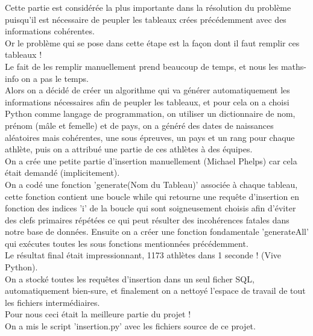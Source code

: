 \documentclass[]{scrreprt}
\begin{document}
		{\large 
			Cette partie est considérée la plus importante dans la résolution du problème puisqu'il est nécessaire de peupler les tableaux crées précédemment avec des informations cohérentes.\\
			Or le problème qui se pose dans cette étape est la façon dont il faut remplir ces tableaux !\\
			Le fait de les remplir manuellement prend beaucoup de temps, et nous les maths-info on a pas le temps.\\
			Alors on a décidé de créer un algorithme qui va générer automatiquement les informations nécessaires afin de peupler les tableaux, et pour cela on a choisi Python comme langage de programmation, on utiliser un dictionnaire de nom, prénom (mâle et femelle) et de pays, on a généré des dates de naissances aléatoires mais cohérentes, une sous épreuves, un pays et un rang pour chaque athlète, puis on a attribué une partie de ces athlètes à des équipes.\\
			On a crée une petite partie d'insertion manuellement (Michael Phelps) car cela était demandé (implicitement).\\
			On a codé une fonction 'generate(Nom du Tableau)' associée à chaque tableau, cette fonction contient une boucle while qui retourne une requête d'insertion en fonction des indices 'i' de la boucle qui sont soigneusement choisis afin d'éviter des clefs primaires répétées ce qui peut résulter des incohérences fatales dans notre base de données. Ensuite on a créer une fonction fondamentale 'generateAll' qui exécutes toutes les sous fonctions mentionnées précédemment.  \\ 
			Le résultat final était impressionnant, 1173 athlètes dans 1 seconde ! (Vive Python).\\
			On a stocké toutes les requêtes d'insertion dans un seul ficher SQL, automatiquement bien-sure, et finalement on a nettoyé l'espace de travail de tout les fichiers intermédiaires.\\
			Pour nous ceci était la meilleure partie du projet !\\
			On a mis le script 'insertion.py' avec les fichiers source de ce projet.\\
			
		}
		
\end{document}
